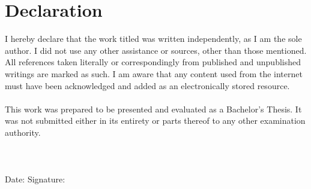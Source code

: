 \section*{Declaration}
I hereby declare that the work titled \printExposeTitle was written independently, as I am the sole author. I did not use any other assistance or sources, other than those mentioned. All references taken literally or correspondingly from published and unpublished writings are marked as such. I am aware that any content used from the internet must have been acknowledged and added as an electronically stored resource.
\\\\
This work was prepared to be presented and evaluated as a Bachelor’s Thesis. It was not submitted either in its entirety or parts thereof to any other examination authority.
\\\\\\\\
Date: \hrulefill  
\hspace{50pt} 
Signature: \hrulefill